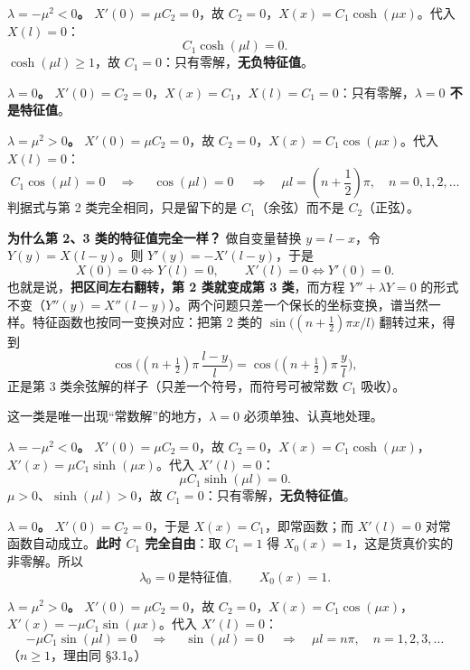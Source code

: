 \documentclass[11pt]{ctexart}
\let\origsubhdr\subhdr
\renewcommand{\subhdr}[1]{\needspace{3\baselineskip}\origsubhdr{#1}}
\begin{document}
\textbf{$\lambda=-\mu^2<0$。} $X'(0)=\mu C_2=0$，故 $C_2=0$，$X(x)=C_1\cosh(\mu x)$。代入 $X(l)=0$：
\[
C_1\cosh(\mu l)=0 .
\]
$\cosh(\mu l)\ge1$，故 $C_1=0$：只有零解，\textbf{无负特征值}。

\textbf{$\lambda=0$。} $X'(0)=C_2=0$，$X(x)=C_1$，$X(l)=C_1=0$：只有零解，\textbf{$\lambda=0$ 不是特征值}。

\textbf{$\lambda=\mu^2>0$。} $X'(0)=\mu C_2=0$，故 $C_2=0$，$X(x)=C_1\cos(\mu x)$。代入 $X(l)=0$：
\[
C_1\cos(\mu l)=0
\quad\Longrightarrow\quad
\boxed{\ \cos(\mu l)=0\ }
\quad\Longrightarrow\quad
\mu l=\left(n+\frac12\right)\pi,\quad n=0,1,2,\dots
\]
判据式与第 2 类完全相同，只是留下的是 $C_1$（余弦）而不是 $C_2$（正弦）。


\textbf{为什么第 2、3 类的特征值完全一样？} 做自变量替换 $y=l-x$，令 $Y(y)=X(l-y)$。则 $Y'(y)=-X'(l-y)$，于是
\[
X(0)=0\iff Y(l)=0,\qquad X'(l)=0\iff Y'(0)=0 .
\]
也就是说，\textbf{把区间左右翻转，第 2 类就变成第 3 类}，而方程 $Y''+\lambda Y=0$ 的形式不变（$Y''(y)=X''(l-y)$）。两个问题只差一个保长的坐标变换，谱当然一样。特征函数也按同一变换对应：把第 2 类的 $\sin\big((n+\frac12)\pi x/l\big)$ 翻转过来，得到
\[
\cos\Big((n+\tfrac12)\pi\,\frac{l-y}{l}\Big)=\cos\Big((n+\tfrac12)\pi\,\frac{y}{l}\Big),
\]
正是第 3 类余弦解的样子（只差一个符号，而符号可被常数 $C_1$ 吸收）。


这一类是唯一出现“常数解”的地方，$\lambda=0$ 必须单独、认真地处理。

\textbf{$\lambda=-\mu^2<0$。} $X'(0)=\mu C_2=0$，故 $C_2=0$，$X(x)=C_1\cosh(\mu x)$，$X'(x)=\mu C_1\sinh(\mu x)$。代入 $X'(l)=0$：
\[
\mu C_1\sinh(\mu l)=0 .
\]
$\mu>0$、$\sinh(\mu l)>0$，故 $C_1=0$：只有零解，\textbf{无负特征值}。

\textbf{$\lambda=0$。} $X'(0)=C_2=0$，于是 $X(x)=C_1$，即常函数；而 $X'(l)=0$ 对常函数自动成立。\textbf{此时 $C_1$ 完全自由}：取 $C_1=1$ 得 $X_0(x)=1$，这是货真价实的非零解。所以
\[
\lambda_0=0\ \text{是特征值},\qquad X_0(x)=1 .
\]

\textbf{$\lambda=\mu^2>0$。} $X'(0)=\mu C_2=0$，故 $C_2=0$，$X(x)=C_1\cos(\mu x)$，$X'(x)=-\mu C_1\sin(\mu x)$。代入 $X'(l)=0$：
\[
-\mu C_1\sin(\mu l)=0
\quad\Longrightarrow\quad
\boxed{\ \sin(\mu l)=0\ }
\quad\Longrightarrow\quad
\mu l=n\pi,\quad n=1,2,3,\dots
\]
（$n\ge1$，理由同 §3.1。）
\end{document}
